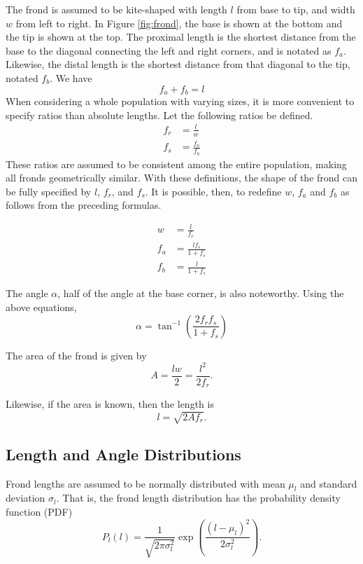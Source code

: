 \documentclass[ms,cpyr,lof,lot]{uathesis}
\begin{document}
The frond is assumed to be kite-shaped with length $l$ from base to tip, and width $w$ from left to right.
In Figure \ref{fig:frond}, the base is shown at the bottom and the tip is shown at the top.
The proximal length is the shortest distance from the base to the diagonal connecting the left and right corners, and is notated as $f_a$.
Likewise, the distal length is the shortest distance from that diagonal to the tip, notated $f_b$.
 We have
 \begin{equation*}
	 f_a + f_b = l
 \end{equation*}
When considering a whole population with varying sizes, it is more convenient to specify ratios than absolute lengths.
Let the following ratios be defined.
\begin{align*}
	f_r &= \frac{l}{w} \\
	f_s &= \frac{f_a}{f_b}
\end{align*}
These ratios are assumed to be consistent among the entire population, making all fronds geometrically similar.
With these definitions, the shape of the frond can be fully specified by $l$, $f_r$, and $f_s$.
It is possible, then, to redefine $w$, $f_a$ and $f_b$ as follows from the preceding formulas.

\begin{align*}
	w &= \frac{l}{f_r} \\
	f_a &= \frac{lf_s}{1+f_s} \\
	f_b &= \frac{l}{1+f_s}
\end{align*}

The angle $\alpha$, half of the angle at the base corner, is also noteworthy.
Using the above equations,
\begin{equation*}
	\alpha = \tan^{-1}\left(\frac{2f_rf_s}{1+f_s}\right)
\end{equation*}

The area of the frond is given by
\begin{equation*}
  A = \frac{lw}{2} = \frac{l^2}{2f_r}.
\end{equation*}

Likewise, if the area is known, then the length is
\begin{equation}
  l = \sqrt{2Af_r}.
  \label{eqn:length-from-area}
\end{equation}

\subsection{Length and Angle Distributions}
\label{sec:dist}
Frond lengths are assumed to be normally distributed with mean $\mu_l$ and standard deviation $\sigma_l$.
That is, the frond length distribution has the probability density function (PDF)
\begin{equation*}
  P_l(l) = \frac{1}{\sqrt{2\pi\sigma_l^2}}\exp\left(\frac{(l-\mu_l)^2}{2\sigma_l^2}\right).
\end{equation*}
\end{document}
